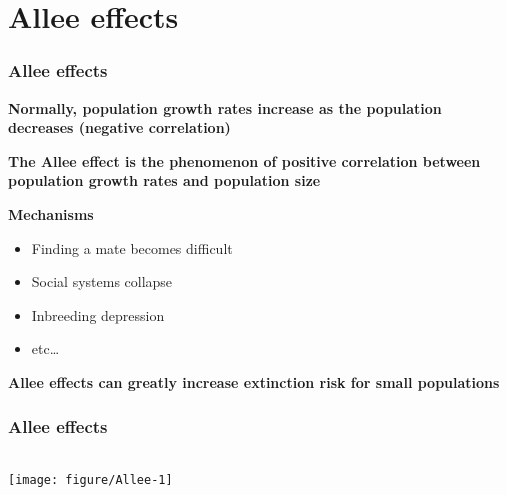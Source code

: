 \documentclass[color=usenames,dvipsnames]{beamer}\usepackage[]{graphicx}\usepackage[]{color}
\begin{document}



\section{Allee effects}



\begin{frame}
  \frametitle{Allee effects}
  {\bf Normally, population growth rates increase as the population
    decreases (negative correlation) \par}
  \pause
  \vfill
  {\bf The Allee effect is the phenomenon of positive correlation
    between population growth rates and population size \par}
  \pause
  \vfill
  {\bf Mechanisms}
  \begin{itemize}
    \item Finding a mate becomes difficult
    \item Social systems collapse
    \item Inbreeding depression
    \item etc\dots
  \end{itemize}
  \pause
  \vfill
  {\bf Allee effects can greatly increase extinction risk for small populations}

\end{frame}



\begin{frame}[fragile]
  \frametitle{Allee effects}

  \begin{columns}
    \column{\dimexpr\paperwidth-10pt}
  \texttt{[image: figure/Allee-1]}
  \end{columns}
\end{frame}
\end{document}
